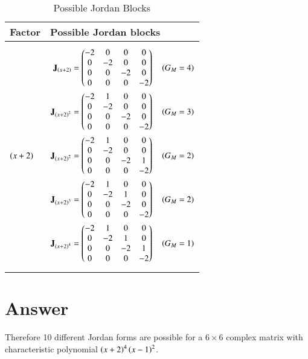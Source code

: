 \documentclass[journal,12pt,twocolumn]{IEEEtran}
\numberwithin{table}{section}
\begin{document}
\begin{table*}[ht!]
\begin{center}
\begin{tabular}{|l|l|}
\hline
\textbf{Factor} & \textbf{Possible Jordan blocks} \\[0.5ex]
\hline
 $\left(x+2\right)$ & 
\parbox{10cm}{\begin{align}
\mathbf{J}_{\left(x+2\right)}=\begin{pmatrix}-2&0&0&0\\0&-2&0&0\\0&0&-2&0\\0&0&0&-2\end{pmatrix} \quad \left(G_M=4\right)\\
\mathbf{J}_{\left(x+2\right)^2}=\begin{pmatrix}-2&1&0&0\\0&-2&0&0\\0&0&-2&0\\0&0&0&-2\end{pmatrix}\quad \left(G_M=3\right)\\
\mathbf{J}_{\left(x+2\right)^2}=\begin{pmatrix}-2&1&0&0\\0&-2&0&0\\0&0&-2&1\\0&0&0&-2\end{pmatrix}\quad \left(G_M=2\right)\\
\mathbf{J}_{\left(x+2\right)^3}=\begin{pmatrix}-2&1&0&0\\0&-2&1&0\\0&0&-2&0\\0&0&0&-2\end{pmatrix}\quad \left(G_M=2\right)\\
\mathbf{J}_{\left(x+2\right)^4}=\begin{pmatrix}-2&1&0&0\\0&-2&1&0\\0&0&-2&1\\0&0&0&-2\end{pmatrix}\quad \left(G_M=1\right)
\end{align}}
\\ [0.5ex] 
\hline
$\brak{x-1}$ & \parbox{10cm}{\begin{align}
\vec{J}_{\brak{x-1}}=\myvec{1&0\\0&1} \quad \quad \brak{G_M=2}\\
\vec{J}_{\brak{x-1}^2}=\myvec{1&1\\0&1} \quad \quad \brak{G_M=1}
\end{align}}
\\ [0.5ex] 
\hline
\end{tabular}
\caption{Possible Jordan Blocks}
\label{table:2}
\end{center}
\vspace{-0.5cm}
\end{table*}
\section{Answer}
Therefore 10 different Jordan forms are possible for a $6\times6$ complex matrix with characteristic polynomial $\left(x+2\right)^4\left(x-1\right)^2$.
\end{document}
